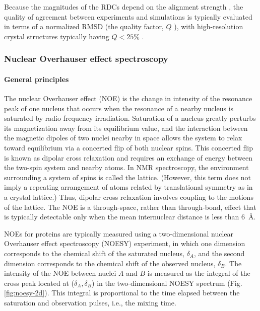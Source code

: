 \documentclass[9pt,review,pubversion]{livecoms}
\begin{document}
Because the magnitudes of the RDCs depend on the alignment strength \cite{tjandra_direct_1997,trigo-mourino_structural_2011}, the quality of agreement between experiments and simulations is typically evaluated in terms of a normalized RMSD (the quality factor, $Q$ \cite{cornilescu_validation_1998}), with high-resolution crystal structures typically having $Q<25$\% \cite{bax2003weak}.

\subsubsection{Nuclear Overhauser effect spectroscopy}
\label{sub2:noesy}

\paragraph{General principles}

The nuclear Overhauser effect (NOE) is the change in intensity of the resonance peak of one nucleus that occurs when the resonance of a nearby nucleus is saturated by radio frequency irradiation.
Saturation of a nucleus greatly perturbs its magnetization away from its equilibrium value, and the interaction between the magnetic dipoles of two nuclei nearby in space allows the system to relax toward equilibrium via a concerted flip of both nuclear spins.
This concerted flip is known as dipolar cross relaxation and requires an exchange of energy between the two-spin system and nearby atoms.
In NMR spectroscopy, the environment surrounding a system of spins is called the lattice.
(However, this term does not imply a repeating arrangement of atoms related by translational symmetry as in a crystal lattice.)
Thus, dipolar cross relaxation involves coupling to the motions of the lattice. The NOE is a through-space, rather than through-bond, effect that is typically detectable only when the mean internuclear distance is less than \qty{6}{\angstrom}.

NOEs for proteins are typically measured using a two-dimensional nuclear Overhauser effect spectroscopy (NOESY) experiment, in which one dimension corresponds to the chemical shift of the saturated nucleus, $\delta_A$, and the second dimension corresponds to the chemical shift of the observed nucleus, $\delta_B$.
The intensity of the NOE between nuclei $A$ and $B$ is measured as the integral of the cross peak located at ($\delta_A, \delta_B$) in the two-dimensional NOESY spectrum (Fig. \ref{fig:noesy-2d}).
This integral is proportional to the time elapsed between the saturation and observation pulses, i.e., the mixing time.
\end{document}
